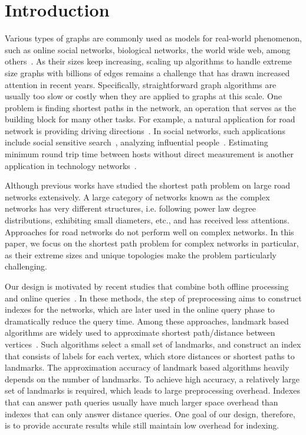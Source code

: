 \section{Introduction}
\label{introduction}

Various types of graphs are commonly used as models for real-world phenomenon, such as online social networks, biological networks, the world wide web, among others~\cite{newman2010networks}. As their sizes keep increasing, scaling up algorithms to handle extreme size graphs with billions of edges remains a challenge that has drawn increased attention in recent years. Specifically, straightforward graph algorithms are usually too slow or costly when they are applied to graphs at this scale. One problem is finding shortest paths in the network, an operation that serves as the building block for many other tasks. For example, a natural application for road network is providing driving directions~\cite{Abraham:2011:HLA:2008623.2008645}. In social networks, such applications include social sensitive search~\cite{Vieira:2007:ESR:1321440.1321520}, analyzing influential people~\cite{Kempe:2003:MSI:956750.956769}. Estimating minimum round trip time between hosts without direct measurement is another application in technology networks~\cite{Tang:2003:VLI:948205.948223}.

Although previous works have studied the shortest path problem on large road networks extensively. A large category of networks known as the complex networks has very different structures, i.e. following power law degree distributions, exhibiting small diameters, etc., and has received less attentions. Approaches for road networks do not perform well on complex networks. In this paper, we focus on the shortest path problem for complex networks in particular, as their extreme sizes and unique topologies make the problem particularly challenging.

Our design is motivated by recent studies that combine both offline processing and online queries~\cite{Potamias:2009:FSP:1645953.1646063, tretyakov2011fast, Akiba:2012:SQC:2247596.2247614, 6399472, Jin:2012:HLA:2213836.2213887}. In these methods, the step of preprocessing aims to construct indexes for the networks, which are later used in the online query phase to dramatically reduce the query time. Among these approaches, landmark based algorithms are widely used to approximate shortest path/distance between vertices~\cite{Thorup:2005:ADO:1044731.1044732, Goldberg:2005:CSP:1070432.1070455, Potamias:2009:FSP:1645953.1646063, Gubichev:2010:FAE:1871437.1871503, tretyakov2011fast, 6399472}. Such algorithms select a small set of landmarks, and construct an index that consists of labels for each vertex, which store distances or shortest paths to landmarks. The approximation accuracy of landmark based algorithms heavily depends on the number of landmarks. To achieve high accuracy, a relatively large set of landmarks is required, which leads to large preprocessing overhead. Indexes that can answer path queries usually have much larger space overhead than indexes that can only answer distance queries. One goal of our design, therefore, is to provide accurate results while still maintain low overhead for indexing.

